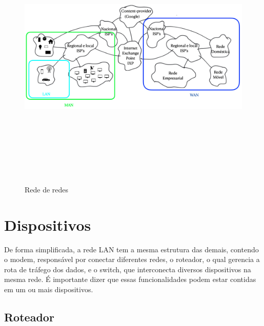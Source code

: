 \begin{figure}[h!]
\centering
\includegraphics[keepaspectratio, width=14cm, height=13cm]{imagens/08/08 - redes.png}
\caption{Rede de redes  \\}
\label{fig:Rede de redes }
\end{figure}



\hypertarget{dispositivos}{%
\section{Dispositivos}\label{dispositivos}}

De forma simplificada, a rede LAN tem a mesma estrutura das demais,
contendo o modem, responsável por conectar diferentes redes, o roteador,
o qual gerencia a rota de tráfego dos dados, e o switch, que
interconecta diversos dispositivos na mesma rede. É importante dizer que
essas funcionalidades podem estar contidas em um ou mais dispositivos.

\hypertarget{roteador}{%
\subsection{Roteador}\label{roteador}}

